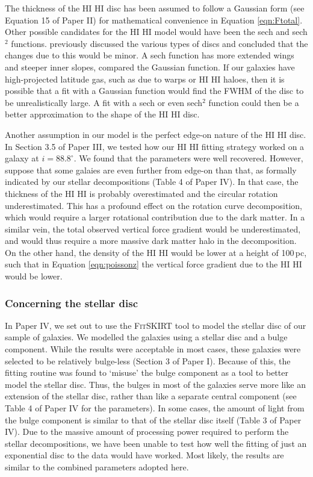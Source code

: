 \documentclass[useAMS,usenatbib]{mn2e}
\newcommand{\hi}{%
  \relax
  \ifmmode
    \textrm{\textsc{HI}}
  \else
    \textsc{H{\smaller}I}
  \fi
}
\begin{document}
The thickness of the \hi disc has been assumed to follow a Gaussian form 
(see Equation 15 of Paper II) for mathematical convenience in 
Equation \ref{eqn:Ftotal}.
Other possible candidates for the \hi model would have been the sech 
and sech$^2$ functions.
\citet{Olling1995A} previously discussed the various types of discs and 
concluded that the changes due to this would be minor.
A sech function has more extended wings and  steeper inner slopes, 
compared the Gaussian function.
If our galaxies have high-projected latitude gas, such as due to warps 
or \hi haloes, then it is possible that a fit with a Gaussian function 
would find the FWHM of the disc to be unrealistically large.
A fit with a sech or even sech$^2$ function could then be a better 
approximation to the shape of the \hi disc. 

Another assumption in our model is the perfect edge-on nature of the \hi disc. 
In Section 3.5 of Paper III, we tested how our \hi fitting strategy 
worked on a galaxy at $i=88.8^\circ$.
We found that the parameters were well recovered. 
However, suppose that some galaies are even further from edge-on than that, as 
formally indicated by our stellar decompositions (Table 4 of Paper IV).
In that case, the thickness of the \hi is probably overestimated and the 
circular rotation underestimated. 
This has a profound effect on the rotation curve decomposition, which 
would require a larger rotational contribution due to the dark matter.
In a similar vein, the total observed vertical force gradient would be 
underestimated, and would thus require a more massive dark matter halo in 
the decomposition. 
On the other hand, the density of the \hi would be lower at a height of 
100\,pc, such that in Equation \ref{eqn:poissonz} the vertical force 
gradient due to the \hi would be lower. 


\subsubsection{Concerning the stellar disc}
In Paper IV, we set out to use the \textsc{FitSKIRT} 
tool to model the stellar disc of our sample of galaxies.
We modelled the galaxies using a stellar disc and a bulge component.
While the  results were acceptable in most cases, these galaxies were 
selected to be relatively bulge-less (Section 3 of Paper I). 
Because of this, the fitting routine was found to `misuse' the bulge 
component as a tool to better model the stellar disc.
Thus, the bulges in most of the galaxies serve more like an extension 
of the stellar disc, rather than like a separate central component (see 
Table 4 of Paper IV for the parameters).
In some cases, the amount of light from the bulge component is similar 
to that of the stellar disc itself (Table 3 of Paper IV). 
Due to the massive amount of processing power required to perform the 
stellar decompositions, we have been unable to test how well the fitting
of just an exponential disc to the data would have worked.
Most likely, the results are similar to the combined parameters adopted here.
\end{document}
